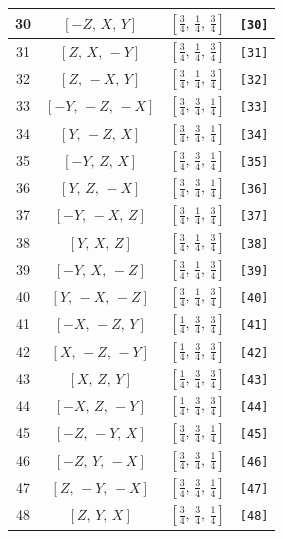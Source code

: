 \documentclass[fleqn,8pt]{jsarticle}
\begin{document}
\begin{longtable}{cccc}
30 & $\left[ - Z,\, X,\, Y \right]$ & $\left[ \frac{3}{4},\, \frac{1}{4},\, \frac{3}{4} \right]$ & {\tt [30]} \\ \hline
31 & $\left[ Z,\, X,\, - Y \right]$ & $\left[ \frac{3}{4},\, \frac{1}{4},\, \frac{3}{4} \right]$ & {\tt [31]} \\ \hline
32 & $\left[ Z,\, - X,\, Y \right]$ & $\left[ \frac{3}{4},\, \frac{1}{4},\, \frac{3}{4} \right]$ & {\tt [32]} \\ \hline
33 & $\left[ - Y,\, - Z,\, - X \right]$ & $\left[ \frac{3}{4},\, \frac{3}{4},\, \frac{1}{4} \right]$ & {\tt [33]} \\ \hline
34 & $\left[ Y,\, - Z,\, X \right]$ & $\left[ \frac{3}{4},\, \frac{3}{4},\, \frac{1}{4} \right]$ & {\tt [34]} \\ \hline
35 & $\left[ - Y,\, Z,\, X \right]$ & $\left[ \frac{3}{4},\, \frac{3}{4},\, \frac{1}{4} \right]$ & {\tt [35]} \\ \hline
36 & $\left[ Y,\, Z,\, - X \right]$ & $\left[ \frac{3}{4},\, \frac{3}{4},\, \frac{1}{4} \right]$ & {\tt [36]} \\ \hline
37 & $\left[ - Y,\, - X,\, Z \right]$ & $\left[ \frac{3}{4},\, \frac{1}{4},\, \frac{3}{4} \right]$ & {\tt [37]} \\ \hline
38 & $\left[ Y,\, X,\, Z \right]$ & $\left[ \frac{3}{4},\, \frac{1}{4},\, \frac{3}{4} \right]$ & {\tt [38]} \\ \hline
39 & $\left[ - Y,\, X,\, - Z \right]$ & $\left[ \frac{3}{4},\, \frac{1}{4},\, \frac{3}{4} \right]$ & {\tt [39]} \\ \hline
40 & $\left[ Y,\, - X,\, - Z \right]$ & $\left[ \frac{3}{4},\, \frac{1}{4},\, \frac{3}{4} \right]$ & {\tt [40]} \\ \hline
41 & $\left[ - X,\, - Z,\, Y \right]$ & $\left[ \frac{1}{4},\, \frac{3}{4},\, \frac{3}{4} \right]$ & {\tt [41]} \\ \hline
42 & $\left[ X,\, - Z,\, - Y \right]$ & $\left[ \frac{1}{4},\, \frac{3}{4},\, \frac{3}{4} \right]$ & {\tt [42]} \\ \hline
43 & $\left[ X,\, Z,\, Y \right]$ & $\left[ \frac{1}{4},\, \frac{3}{4},\, \frac{3}{4} \right]$ & {\tt [43]} \\ \hline
44 & $\left[ - X,\, Z,\, - Y \right]$ & $\left[ \frac{1}{4},\, \frac{3}{4},\, \frac{3}{4} \right]$ & {\tt [44]} \\ \hline
45 & $\left[ - Z,\, - Y,\, X \right]$ & $\left[ \frac{3}{4},\, \frac{3}{4},\, \frac{1}{4} \right]$ & {\tt [45]} \\ \hline
46 & $\left[ - Z,\, Y,\, - X \right]$ & $\left[ \frac{3}{4},\, \frac{3}{4},\, \frac{1}{4} \right]$ & {\tt [46]} \\ \hline
47 & $\left[ Z,\, - Y,\, - X \right]$ & $\left[ \frac{3}{4},\, \frac{3}{4},\, \frac{1}{4} \right]$ & {\tt [47]} \\ \hline
48 & $\left[ Z,\, Y,\, X \right]$ & $\left[ \frac{3}{4},\, \frac{3}{4},\, \frac{1}{4} \right]$ & {\tt [48]} \\
\end{longtable}
\end{document}
